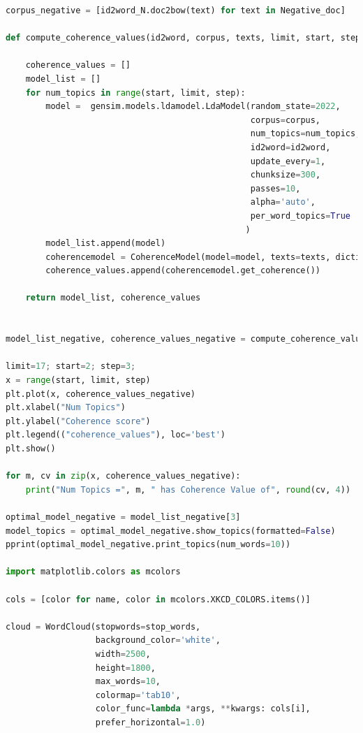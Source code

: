 \documentclass[12pt]{article}
\begin{document}
\begin{lstlisting}[language = Python]
corpus_negative = [id2word_N.doc2bow(text) for text in Negative_doc]

def compute_coherence_values(id2word, corpus, texts, limit, start, step):
    
    coherence_values = []
    model_list = []
    for num_topics in range(start, limit, step):
        model =  gensim.models.ldamodel.LdaModel(random_state=2022, 
                                                 corpus=corpus, 
                                                 num_topics=num_topics, 
                                                 id2word=id2word,
                                                 update_every=1,
                                                 chunksize=300,
                                                 passes=10,
                                                 alpha='auto',
                                                 per_word_topics=True
                                                )
        model_list.append(model)
        coherencemodel = CoherenceModel(model=model, texts=texts, dictionary=id2word, coherence='c_v')
        coherence_values.append(coherencemodel.get_coherence())

    return model_list, coherence_values


model_list_negative, coherence_values_negative = compute_coherence_values(id2word=id2word_N, corpus=corpus_negative, texts=Negative_doc, start=2, limit=17, step=3)

limit=17; start=2; step=3;
x = range(start, limit, step)
plt.plot(x, coherence_values_negative)
plt.xlabel("Num Topics")
plt.ylabel("Coherence score")
plt.legend(("coherence_values"), loc='best')
plt.show()

for m, cv in zip(x, coherence_values_negative):
    print("Num Topics =", m, " has Coherence Value of", round(cv, 4))
    
optimal_model_negative = model_list_negative[3]
model_topics = optimal_model_negative.show_topics(formatted=False)
pprint(optimal_model_negative.print_topics(num_words=10))

import matplotlib.colors as mcolors

cols = [color for name, color in mcolors.XKCD_COLORS.items()]

cloud = WordCloud(stopwords=stop_words,
                  background_color='white',
                  width=2500,
                  height=1800,
                  max_words=10,
                  colormap='tab10',
                  color_func=lambda *args, **kwargs: cols[i],
                  prefer_horizontal=1.0)


\end{lstlisting}
\end{document}
